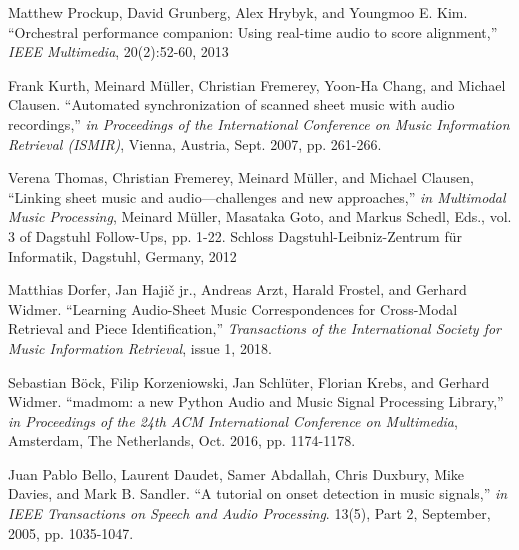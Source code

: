 \documentclass[letterpaper, 10pt, conference]{ieeeconf}  %
\begin{document}
\begin{thebibliography}{99}
Matthew Prockup, David Grunberg, Alex Hrybyk, and Youngmoo E. Kim. 
``Orchestral performance companion:  Using real-time audio to score alignment,''
\textit{IEEE Multimedia}, 20(2):52-60, 2013

Frank Kurth, Meinard M\"{u}ller, Christian Fremerey, Yoon-Ha Chang, and Michael Clausen.
``Automated synchronization of scanned sheet music with audio recordings,'' 
\textit{in Proceedings of the International Conference on Music Information Retrieval (ISMIR)}, Vienna, Austria, Sept. 2007, pp. 261-266.

Verena Thomas, Christian Fremerey, Meinard M\"{u}ller, and Michael Clausen, ``Linking sheet music and audio---challenges and new approaches,'' 
\textit{in Multimodal Music Processing},
Meinard M\"{u}ller, Masataka Goto, and Markus Schedl, Eds., vol. 3 of Dagstuhl Follow-Ups, pp. 1-22. Schloss Dagstuhl-Leibniz-Zentrum f\"{u}r Informatik, Dagstuhl, Germany, 2012

Matthias Dorfer, Jan Haji\v{c} jr., Andreas Arzt, Harald Frostel, and Gerhard Widmer. 
``Learning Audio-Sheet Music Correspondences for Cross-Modal Retrieval and Piece Identification,'' 
\textit{Transactions of the International Society for Music Information Retrieval}, issue 1, 2018.

Sebastian B{\"o}ck, Filip Korzeniowski, Jan Schl{\"u}ter, Florian Krebs, and Gerhard Widmer.
``madmom: a new Python Audio and Music Signal Processing Library,''
\textit{in Proceedings of the 24th ACM International Conference on Multimedia}, Amsterdam, The Netherlands, Oct. 2016, pp. 1174-1178.

Juan Pablo Bello, Laurent Daudet, Samer Abdallah, Chris Duxbury, Mike Davies, and Mark B. Sandler.
``A tutorial on onset detection in music signals,''
\textit{in IEEE Transactions on Speech and Audio Processing}. 13(5), Part 2,  September, 2005, pp. 1035-1047.

\end{thebibliography}
\end{document}
